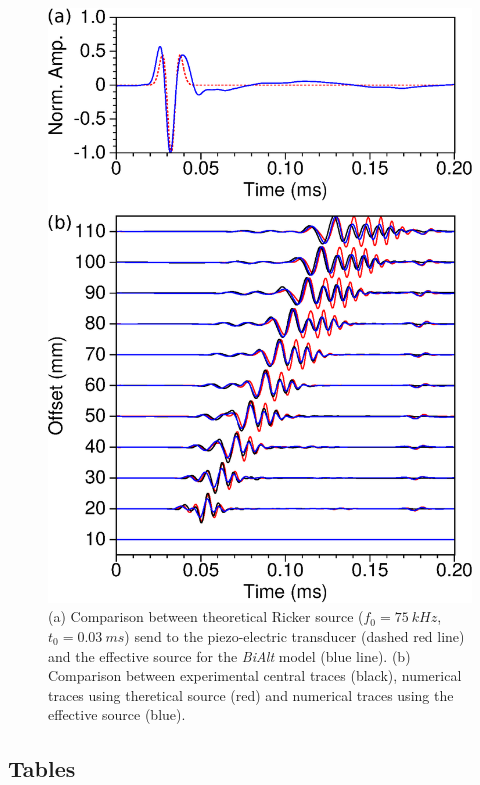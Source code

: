 \documentclass[manuscript,revised]{geophysics}
\begin{document}


\begin{figure}[!h]
	\centering
	\includegraphics[scale=0.5]{fig/panel_bialt_lswe.eps}
	\caption{(a) Comparison between theoretical Ricker source ($f_{0}=75\ kHz$, $t_{0}=0.03\ ms$) send to the piezo-electric transducer (dashed red line) and the effective source for the \textit{BiAlt} model (blue line). (b) Comparison between experimental central traces (black), numerical traces using theretical source (red) and numerical traces using the effective source (blue).}
	\label{blind-test}
\end{figure}

\clearpage
\newpage

\subsection*{Tables}
\end{document}
